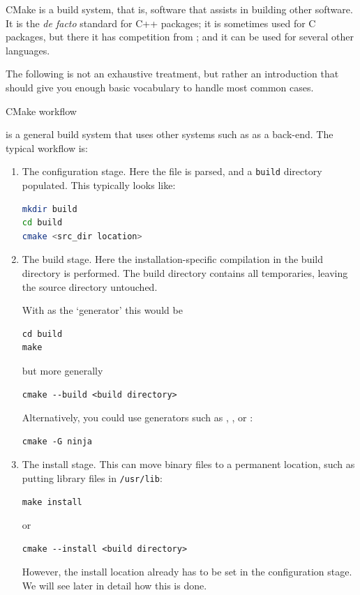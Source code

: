 CMake is a build system, that is, software that assists in building other software.
It is the \emph{de facto} standard for C++ packages;
it is sometimes used for C packages, but there it has competition from ;
and it can be used for several other languages.

The following is not an exhaustive treatment, but rather an introduction that
should give you enough basic vocabulary to handle most common cases.

 {CMake workflow}

 is a general build system that uses other systems
such as  as a back-end.
The typical workflow is:
\begin{enumerate}
\item The configuration stage. Here the  file
  is parsed, and a \lstinline[language=shell]{build} directory populated. This typically looks like:
\begin{lstlisting}[language=zsh]
mkdir build
cd build
cmake <src_dir location>
\end{lstlisting}
\item The build stage. Here the installation-specific compilation
  in the build directory is performed.
  The build directory contains all temporaries,
  leaving the source directory untouched.

  With  as the `generator' this would be
\begin{lstlisting}[language=shell]
cd build
make
\end{lstlisting}
but more generally
\begin{lstlisting}[language=shell]
cmake --build <build directory>
\end{lstlisting}
Alternatively, you could use generators such as ,
, or :
\begin{lstlisting}[language=shell]
cmake -G ninja
\end{lstlisting}
\item The install stage. This can move binary files to a permanent
  location, such as putting library files in \lstinline[language=shell]{/usr/lib}:
\begin{lstlisting}[language=shell]
make install
\end{lstlisting}
or 
\begin{lstlisting}[language=shell]
cmake --install <build directory>
\end{lstlisting}
However, the install location already has to be set in the configuration stage.
We will see later in detail how this is done.
\end{enumerate}

